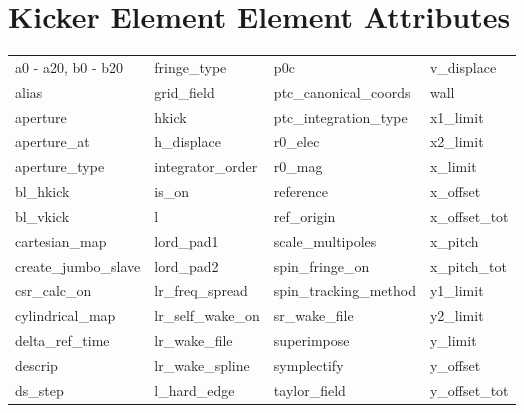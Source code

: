  \vfill
 
 \section{Kicker Element Element Attributes}
 \label{s:list.kicker}
 
 \begin{tabular}{llll} \toprule
a0 - a20, b0 - b20          & fringe_type                 & p0c                         & v_displace                  \\
alias                       & grid_field                  & ptc_canonical_coords        & wall                        \\
aperture                    & hkick                       & ptc_integration_type        & x1_limit                    \\
aperture_at                 & h_displace                  & r0_elec                     & x2_limit                    \\
aperture_type               & integrator_order            & r0_mag                      & x_limit                     \\
bl_hkick                    & is_on                       & reference                   & x_offset                    \\
bl_vkick                    & l                           & ref_origin                  & x_offset_tot                \\
cartesian_map               & lord_pad1                   & scale_multipoles            & x_pitch                     \\
create_jumbo_slave          & lord_pad2                   & spin_fringe_on              & x_pitch_tot                 \\
csr_calc_on                 & lr_freq_spread              & spin_tracking_method        & y1_limit                    \\
cylindrical_map             & lr_self_wake_on             & sr_wake_file                & y2_limit                    \\
delta_ref_time              & lr_wake_file                & superimpose                 & y_limit                     \\
descrip                     & lr_wake_spline              & symplectify                 & y_offset                    \\
ds_step                     & l_hard_edge                 & taylor_field                & y_offset_tot                \\

\end{tabular}
